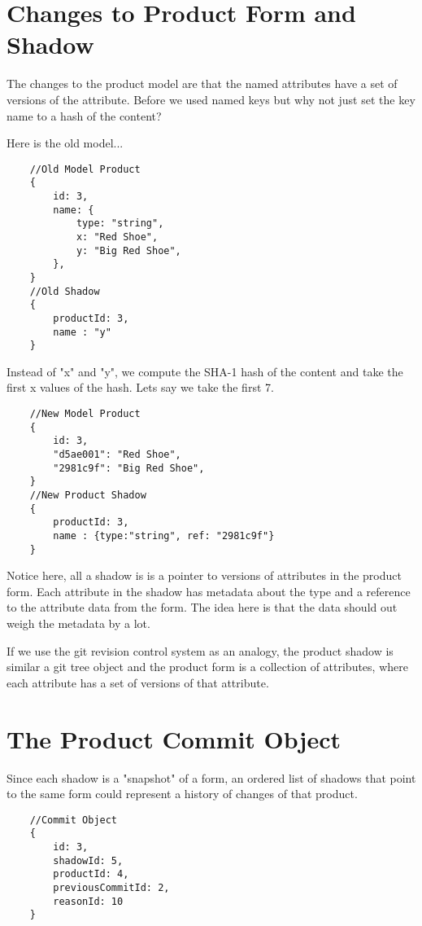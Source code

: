 \documentclass[11pt]{article}
\begin{document}
\section{Changes to Product Form and Shadow}

The changes to the product model are that the named attributes have a set 
of versions of the attribute. Before we used named keys but why not just
set the key name to a hash of the content?

Here is the old model...

\begin{lstlisting}
    //Old Model Product 
    {
        id: 3,
        name: { 
            type: "string", 
            x: "Red Shoe", 
            y: "Big Red Shoe", 
        },
    }
    //Old Shadow
    {
        productId: 3,
        name : "y"
    }
\end{lstlisting}

Instead of "x" and "y", we compute the SHA-1 hash of the content and take the
first x values of the hash. Lets say we take the first 7.

\begin{lstlisting}
    //New Model Product 
    {
        id: 3,
        "d5ae001": "Red Shoe", 
        "2981c9f": "Big Red Shoe", 
    }
    //New Product Shadow
    {
        productId: 3,
        name : {type:"string", ref: "2981c9f"}
    }
\end{lstlisting}

Notice here, all a shadow is is a pointer to versions of attributes in the
product form. Each attribute in the shadow has metadata about the type and a 
reference to the attribute data from the form. The idea here is that the data
should out weigh the metadata by a lot. 

If we use the git revision control system as an analogy, the product 
shadow is similar a git tree object and the product form is a collection of 
attributes, where each attribute has a set of versions of that attribute.


\section{The Product Commit Object}

Since each shadow is a "snapshot" of a form, an ordered list of shadows that 
point to the same form could represent a history of changes of that product.

\begin{lstlisting}
    //Commit Object
    {
        id: 3,
        shadowId: 5,
        productId: 4,
        previousCommitId: 2,
        reasonId: 10
    }
\end{lstlisting}
\end{document}
